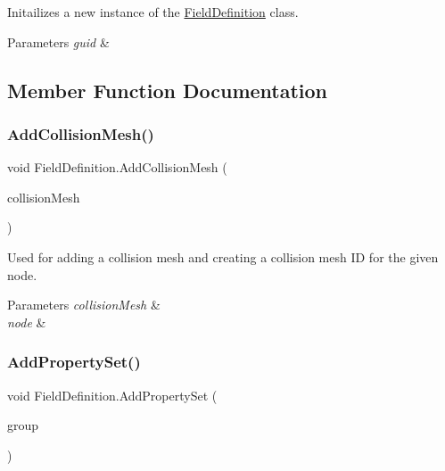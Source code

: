Initailizes a new instance of the \hyperlink{class_field_definition}{Field\+Definition} class. 


\begin{DoxyParams}{Parameters}
{\em guid} & \\
\hline
\end{DoxyParams}


\subsection{Member Function Documentation}
\mbox{\label{class_field_definition_a23223a256c66e90bdb4cd80af64ac36a}} 
\subsubsection{\texorpdfstring{Add\+Collision\+Mesh()}{AddCollisionMesh()}}
{\footnotesize\ttfamily void Field\+Definition.\+Add\+Collision\+Mesh (\begin{DoxyParamCaption}\item[{\hyperlink{class_b_x_d_a_mesh_1_1_b_x_d_a_sub_mesh}{B\+X\+D\+A\+Mesh.\+B\+X\+D\+A\+Sub\+Mesh}}]{collision\+Mesh }\end{DoxyParamCaption})}



Used for adding a collision mesh and creating a collision mesh ID for the given node. 


\begin{DoxyParams}{Parameters}
{\em collision\+Mesh} & \\
\hline
{\em node} & \\
\hline
\end{DoxyParams}
\mbox{\label{class_field_definition_a60993e440fc55566badba6799f94310a}} 
\subsubsection{\texorpdfstring{Add\+Property\+Set()}{AddPropertySet()}}
{\footnotesize\ttfamily void Field\+Definition.\+Add\+Property\+Set (\begin{DoxyParamCaption}\item[{\hyperlink{struct_property_set}{Property\+Set}}]{group }\end{DoxyParamCaption})}



